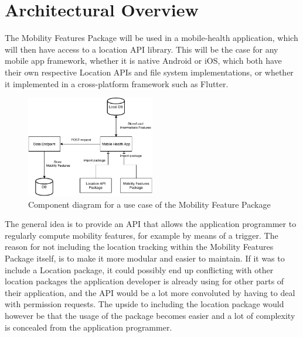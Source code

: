 \section{Architectural Overview}
The Mobility Features Package will be used in a mobile-health application, which will then have access to a location API library. This will be the case for any mobile app framework, whether it is native Android or iOS, which both have their own respective Location APIs and file system implementations, or whether it implemented in a cross-platform framework such as Flutter. 


\begin{figure}[h]
    \centering
    \includegraphics[width=0.5\textwidth]{images/diagrams/data-flow.pdf}
    \caption{Component diagram for a use case of the Mobility Feature Package}
    \label{fig:component-diagram}
\end{figure}

The general idea is to provide an API that allows the application programmer to regularly compute mobility features, for example by means of a trigger. The reason for not including the location tracking within the Mobility Features Package itself, is to make it more modular and easier to maintain. If it was to include a Location package, it could possibly end up conflicting with other location packages the application developer is already using for other parts of their application, and the API would be a lot more convoluted by having to deal with permission requests. The upside to including the location package would however be that the usage of the package becomes easier and a lot of complexity is concealed from the application programmer. 

